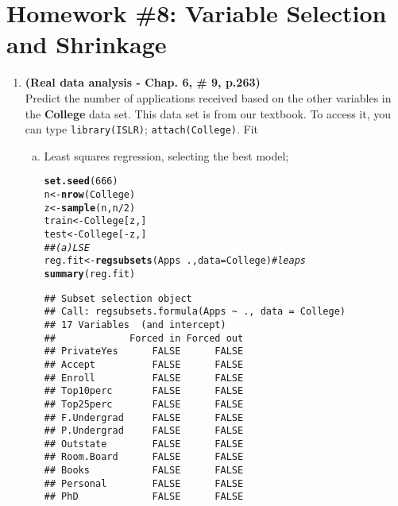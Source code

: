 \documentclass[12pt,fleqn]{article}\usepackage[]{graphicx}\usepackage[]{color}
\makeatletter
\newcommand{\hlnum}[1]{\textcolor[rgb]{0.686,0.059,0.569}{#1}}%
\newcommand{\hlcom}[1]{\textcolor[rgb]{0.678,0.584,0.686}{\textit{#1}}}%
\newcommand{\hlopt}[1]{\textcolor[rgb]{0,0,0}{#1}}%
\newcommand{\hlstd}[1]{\textcolor[rgb]{0.345,0.345,0.345}{#1}}%
\newcommand{\hlkwb}[1]{\textcolor[rgb]{0.69,0.353,0.396}{#1}}%
\newcommand{\hlkwc}[1]{\textcolor[rgb]{0.333,0.667,0.333}{#1}}%
\newcommand{\hlkwd}[1]{\textcolor[rgb]{0.737,0.353,0.396}{\textbf{#1}}}%
\newenvironment{kframe}{%
 \def\at@end@of@kframe{}%
 \ifinner\ifhmode%
  \def\at@end@of@kframe{\end{minipage}}%
  \begin{minipage}{\columnwidth}%
 \fi\fi%
 \def\FrameCommand##1{\hskip\@totalleftmargin \hskip-\fboxsep
 \colorbox{shadecolor}{##1}\hskip-\fboxsep
     \hskip-\linewidth \hskip-\@totalleftmargin \hskip\columnwidth}%
 \MakeFramed {\advance\hsize-\width
   \@totalleftmargin\z@ \linewidth\hsize
   \@setminipage}}%
 {\par\unskip\endMakeFramed%
 \at@end@of@kframe}
\newenvironment{knitrout}{}{} %
\theoremstyle{definition}
\makeatother
\begin{document}
\rhead{\today}




\section*{Homework \#8: Variable Selection and Shrinkage}

	\begin{enumerate}[1.]
    \item \textbf{(Real data analysis - Chap. 6, \# 9, p.263)}\\
    Predict the number of applications received based on the other variables in the \textbf{College} data set. This data set is from our textbook. To access it, you can type \texttt{library(ISLR)}; \texttt{attach(College)}. Fit
		  \begin{enumerate}[(a)]
  			\item Least squares regression, selecting the best model;
\begin{knitrout}
\color{fgcolor}\begin{kframe}
\begin{alltt}
\hlkwd{set.seed}\hlstd{(}\hlnum{666}\hlstd{)}
\hlstd{n} \hlkwb{<-} \hlkwd{nrow}\hlstd{(College)}
\hlstd{z} \hlkwb{<-} \hlkwd{sample}\hlstd{(n,n}\hlopt{/}\hlnum{2}\hlstd{)}
\hlstd{train} \hlkwb{<-} \hlstd{College[z,]}
\hlstd{test} \hlkwb{<-} \hlstd{College[}\hlopt{-}\hlstd{z,]}
\hlcom{## (a) LSE}
\hlstd{reg.fit} \hlkwb{<-} \hlkwd{regsubsets}\hlstd{(Apps} \hlopt{~} \hlstd{.,} \hlkwc{data} \hlstd{= College)} \hlcom{# leaps}
\hlkwd{summary}\hlstd{(reg.fit)}
\end{alltt}
\begin{verbatim}
## Subset selection object
## Call: regsubsets.formula(Apps ~ ., data = College)
## 17 Variables  (and intercept)
##             Forced in Forced out
## PrivateYes      FALSE      FALSE
## Accept          FALSE      FALSE
## Enroll          FALSE      FALSE
## Top10perc       FALSE      FALSE
## Top25perc       FALSE      FALSE
## F.Undergrad     FALSE      FALSE
## P.Undergrad     FALSE      FALSE
## Outstate        FALSE      FALSE
## Room.Board      FALSE      FALSE
## Books           FALSE      FALSE
## Personal        FALSE      FALSE
## PhD             FALSE      FALSE

\end{verbatim}
\end{kframe}
\end{knitrout}
\end{enumerate}
\end{enumerate}
\end{document}
